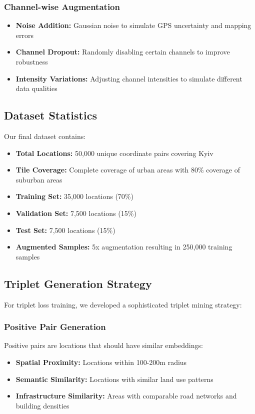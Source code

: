 \subsubsection{Channel-wise Augmentation}
\begin{itemize}
    \item \textbf{Noise Addition:} Gaussian noise to simulate GPS uncertainty and mapping errors
    \item \textbf{Channel Dropout:} Randomly disabling certain channels to improve robustness
    \item \textbf{Intensity Variations:} Adjusting channel intensities to simulate different data qualities
\end{itemize}

\subsection{Dataset Statistics}

Our final dataset contains:

\begin{itemize}
    \item \textbf{Total Locations:} 50,000 unique coordinate pairs covering Kyiv
    \item \textbf{Tile Coverage:} Complete coverage of urban areas with 80\% coverage of suburban areas
    \item \textbf{Training Set:} 35,000 locations (70\%)
    \item \textbf{Validation Set:} 7,500 locations (15\%)
    \item \textbf{Test Set:} 7,500 locations (15\%)
    \item \textbf{Augmented Samples:} 5x augmentation resulting in 250,000 training samples
\end{itemize}

\subsection{Triplet Generation Strategy}

For triplet loss training, we developed a sophisticated triplet mining strategy:

\subsubsection{Positive Pair Generation}
Positive pairs are locations that should have similar embeddings:
\begin{itemize}
    \item \textbf{Spatial Proximity:} Locations within 100-200m radius
    \item \textbf{Semantic Similarity:} Locations with similar land use patterns
    \item \textbf{Infrastructure Similarity:} Areas with comparable road networks and building densities
\end{itemize}

